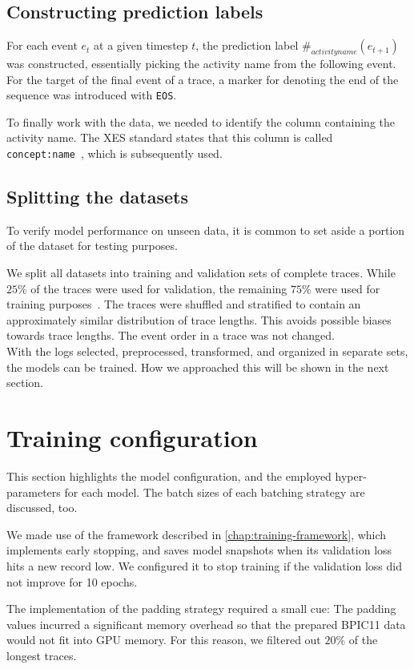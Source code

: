 \subsection*{Constructing prediction labels}
For each event $e_t$ at a given timestep $t$, the prediction label $\#_{activity name}(e_{t+1})$ was constructed, essentially picking the activity name from the following event. For the target of the final event of a trace, a marker for denoting the end of the sequence was introduced with \verb=EOS=.

To finally work with the data, we needed to identify the column containing the activity name.
The XES standard states that this column is called \verb=concept:name=~\cite{Aalst2016}, which is subsequently used.

\subsection*{Splitting the datasets}
To verify model performance on unseen data, it is common to set aside a portion of the dataset for testing purposes.

We split all datasets into training and validation sets of complete traces. While $25\%$ of the traces were used for validation, the remaining $75\%$ were used for training purposes~\cite{kuhn2013applied}. The traces were shuffled and stratified to contain an approximately similar distribution of trace lengths. This avoids possible biases towards trace lengths. The event order in a trace was not changed.\\

With the logs selected, preprocessed, transformed, and organized in separate sets, the models can be trained. How we approached this will be shown in the next section.

\section{Training configuration}\label{sec:method:test-setup}
This section highlights the model configuration, and the employed hyper-parameters for each model.
The batch sizes of each batching strategy are discussed, too.

We made use of the framework described in \autoref{chap:training-framework}, which implements early stopping, and saves model snapshots when its validation loss hits a new record low. We configured it to stop training if the validation loss did not improve for 10 epochs.

The implementation of the padding strategy required a small cue: The padding values incurred a significant memory overhead so that the prepared BPIC11 data would not fit into GPU memory.
For this reason, we filtered out $20\%$ of the longest traces.

